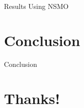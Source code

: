 \documentclass[aspectratio=169,11pt]{beamer}
\begin{document}
\begin{frame}{Results Using NSMO}
    
\end{frame}

\section{Conclusion}
\begin{frame}{Conclusion}
    
\end{frame}

\section{Thanks!}
\begin{frame}
\sectionpage
\end{frame}
\end{document}

